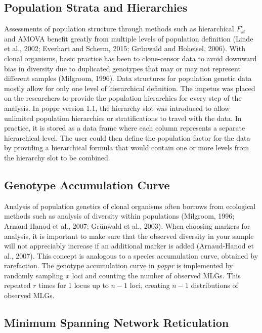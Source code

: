 \documentclass{frontiersSCNS} %
\begin{document}
\subsection*{Population Strata and
Hierarchies}\label{population-strata-and-hierarchies}

Assessments of population structure through methods such as hierarchical
\(F_{st}\) and AMOVA benefit greatly from multiple levels of population
definition (Linde et al., 2002; Everhart and Scherm, 2015; Gr{ü}nwald
and Hoheisel, 2006). With clonal organisms, basic practice has been to
clone-censor data to avoid downward bias in diversity due to duplicated
genotypes that may or may not represent different samples (Milgroom,
1996). Data structures for population genetic data mostly allow for only
one level of hierarchical definition. The impetus was placed on the
researchers to provide the population hierarchies for every step of the
analysis. In poppr version 1.1, the hierarchy slot was introduced to
allow unlimited population hierarchies or stratifications to travel with
the data. In practice, it is stored as a data frame where each column
represents a separate hierarchical level. The user could then define the
population factor for the data by providing a hierarchical formula that
would contain one or more levels from the hierarchy slot to be combined.

\subsection*{Genotype Accumulation
Curve}\label{genotype-accumulation-curve}

Analysis of population genetics of clonal organisms often borrows from
ecological methods such as analysis of diversity within populations
(Milgroom, 1996; Arnaud-Hanod et al., 2007; Grünwald et al., 2003). When
choosing markers for analysis, it is important to make sure that the
observed diversity in your sample will not appreciably increase if an
additional marker is added (Arnaud-Hanod et al., 2007). This concept is
analogous to a species accumulation curve, obtained by rarefaction. The
genotype accumulation curve in \emph{poppr} is implemented by randomly
sampling \(x\) loci and counting the number of observed MLGs. This
repeated \(r\) times for 1 locus up to \(n-1\) loci, creating \(n-1\)
distributions of observed MLGs.

\subsection*{Minimum Spanning Network
Reticulation}\label{minimum-spanning-network-reticulation}
\end{document}

